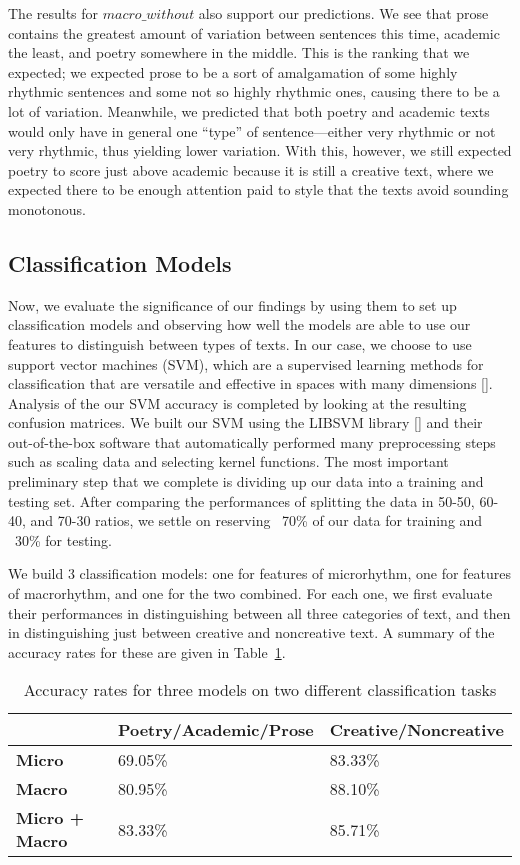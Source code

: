 \documentclass[pageno]{jpaper}
\newcommand{\quotes}[1]{``#1''}
\begin{document}
The results for $macro\_without$ also support our predictions. We see that prose contains the greatest amount of variation between sentences this time, academic the least, and poetry somewhere in the middle. This is the ranking that we expected; we expected prose to be a sort of amalgamation of some highly rhythmic sentences and some not so highly rhythmic ones, causing there to be a lot of variation. Meanwhile, we predicted that both poetry and academic texts would only have in general one \quotes{type} of sentence---either very rhythmic or not very rhythmic, thus yielding lower variation. With this, however, we still expected poetry to score just above academic because it is still a creative text, where we expected there to be enough attention paid to style that the texts avoid sounding monotonous.


\subsection{Classification Models}
Now, we evaluate the significance of our findings by using them to set up classification models and observing how well the models are able to use our features to distinguish between types of texts. In our case, we choose to use support vector machines (SVM), which are a supervised learning methods for classification that are versatile and effective in spaces with many dimensions []. Analysis of the our SVM accuracy is completed by looking at the resulting confusion matrices. We built our SVM using the LIBSVM library [] and their out-of-the-box software that automatically performed many preprocessing steps such as scaling data and selecting kernel functions. The most important preliminary step that we complete is dividing up our data into a training and testing set. After comparing the performances of splitting the data in 50-50, 60-40, and 70-30 ratios, we settle on reserving ~70\% of our data for training and ~30\% for testing. 

We build 3 classification models: one for features of microrhythm, one for features of macrorhythm, and one for the two combined. For each one, we first evaluate their performances in distinguishing between all three categories of text, and then in distinguishing just between creative and noncreative text. A summary of the accuracy rates for these are given in Table~\ref{table:svm}.

\begin{table}[hbt]
  \centering
  \begin{tabular}{l l l}
    \hline \hline
    &\textbf{Poetry/Academic/Prose}&\textbf{Creative/Noncreative} \\ [0.5ex] 
    \hline\hline
    \textbf{Micro} & 69.05\% &  83.33\%  \\
     \textbf{Macro} & 80.95\% & 88.10\%\\
     \textbf{Micro + Macro} & 83.33\% & 85.71\%  \\
    \hline
  \end{tabular}
  \caption{Accuracy rates for three models on two different classification tasks}
  \label{table:svm}
\end{table}
\end{document}
